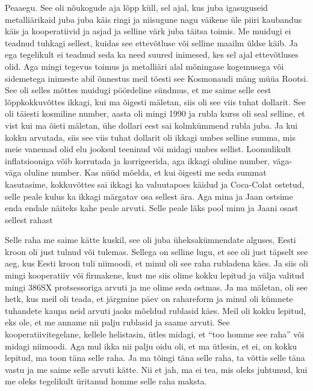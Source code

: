 Peaaegu. See oli nõukogude aja lõpp küll, sel ajal, kus juba igasuguseid 
metalliärikaid juba juba käis ringi ja niisugune nagu väikene üle piiri  
kaubandus käis ja kooperatiivid ja asjad ja selline värk juba täitsa toimis. Me 
muidugi ei teadnud tuhkagi sellest, kuidas  see  ettevõtluse või selline maailm 
üldse käib. Ja ega tegelikult ei teadnud seda ka need suured inimesed, kes sel 
ajal ettevõtluses olid. Aga mingi tegevus toimus ja metalliäri alal 
mõningase kogemusega või 
sidemetega inimeste abil õnnestus meil tõesti see Kosmonaudi mäng müüa Rootsi. 
See oli selles mõttes muidugi pöördeline sündmus, et me saime selle eest 
lõppkokkuvõttes ikkagi, kui ma õigesti mäletan, siis oli see viis tuhat 
dollarit. See oli täiesti kosmiline number,  aasta oli mingi 1990 ja rubla 
kurss oli seal selline, et vist kui ma õieti mäletan, ühe dollari eest sai 
kolmkümmend rubla juba. Ja kui kokku arvutada, siis see viis tuhat dollarit 
oli ikkagi umbes selline summa, mis meie vanemad olid elu jooksul teeninud või 
midagi umbes sellist. Loomulikult inflatsiooniga võib korrutada ja 
korrigeerida, aga ikkagi oluline number, väga-väga oluline number. Kas 
nüüd mõelda, et kui õigesti me seda summat  kasutasime, kokkuvõttes sai ikkagi 
ka valuutapoes käidud ja Coca-Colat ostetud, selle peale kulus ka ikkagi 
märgatav osa sellest ära. Aga mina ja Jaan ostsime enda endale näiteks kahe 
peale arvuti. Selle peale läks pool minu ja Jaani osast sellest rahast 

Selle raha me saime kätte kuskil, see oli juba üheksakümnendate alguses,  Eesti 
kroon oli just tulnud või tulemas. Sellega on selline lugu, et see oli just 
täpselt see aeg, kus Eesti kroon tuli niimoodi, et minul oli see raha rubladena 
käes. Ja siis oli mingi kooperatiiv või firmakene, kust me siis olime kokku 
lepitud ja välja valitud mingi 386SX protsessoriga arvuti ja me olime seda 
ostmas. Ja ma mäletan, oli see hetk, kus meil oli teada, et järgmine 
päev on rahareform ja minul oli kümnete tuhandete 
kaupa neid arvuti jaoks mõeldud rublasid käes. Meil oli kokku 
lepitud, eks ole, et me anname nii palju rublasid ja saame  
arvuti. See kooperatiivitegelane, kellele helistasin, ütles midagi, et \enquote{too 
homme see raha} või midagi niimoodi. Aga mul ikka nii palju oidu oli, et ma 
ütlesin, et ei, on kokku lepitud, ma toon täna selle raha. Ja ma tõingi täna 
selle raha, ta võttis selle täna vastu ja me saime selle arvuti kätte. 
Nii et jah, ma ei tea, mis oleks 
juhtunud, kui me oleks tegelikult üritanud homme selle raha  maksta. 


